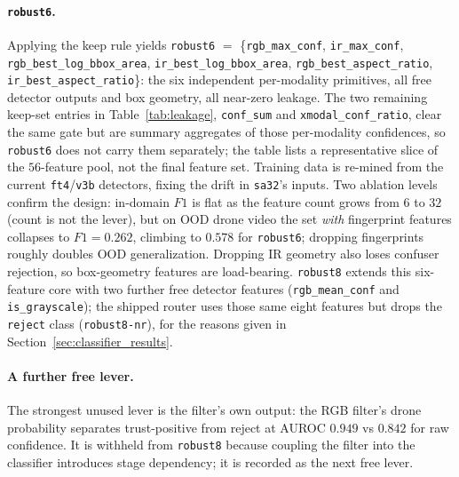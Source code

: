 \paragraph{\texttt{robust6}.}
Applying the keep rule yields \texttt{robust6} $=$ \{\texttt{rgb\_max\_conf}, \texttt{ir\_max\_conf}, \texttt{rgb\_best\_\allowbreak log\_bbox\_area}, \texttt{ir\_best\_\allowbreak log\_bbox\_area}, \texttt{rgb\_best\_\allowbreak aspect\_ratio}, \texttt{ir\_best\_\allowbreak aspect\_ratio}\}: the six independent per-modality primitives, all free detector outputs and box geometry, all near-zero leakage. The two remaining keep-set entries in Table~\ref{tab:leakage}, \texttt{conf\_sum} and \texttt{xmodal\_conf\_ratio}, clear the same gate but are summary aggregates of those per-modality confidences, so \texttt{robust6} does not carry them separately; the table lists a representative slice of the $56$-feature pool, not the final feature set. Training data is re-mined from the current \texttt{ft4}/\texttt{v3b} detectors, fixing the drift in \texttt{sa32}'s inputs. Two ablation levels confirm the design: in-domain $F1$ is flat as the feature count grows from $6$ to $32$ (count is not the lever), but on OOD drone video the set \emph{with} fingerprint features collapses to $F1=0.262$, climbing to $0.578$ for \texttt{robust6}; dropping fingerprints roughly doubles OOD generalization. Dropping IR geometry also loses confuser rejection, so box-geometry features are load-bearing. \texttt{robust8} extends this six-feature core with two further free detector features (\texttt{rgb\_mean\_conf} and \texttt{is\_grayscale}); the shipped router uses those same eight features but drops the \texttt{reject} class (\texttt{robust8-nr}), for the reasons given in Section~\ref{sec:classifier_results}.

\paragraph{A further free lever.}
The strongest unused lever is the filter's own output: the RGB filter's drone probability separates trust-positive from reject at AUROC $0.949$ vs $0.842$ for raw confidence. It is withheld from \texttt{robust8} because coupling the filter into the classifier introduces stage dependency; it is recorded as the next free lever.

